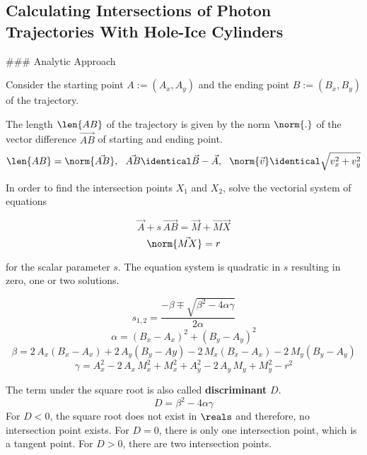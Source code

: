 
\subsection{Calculating Intersections of Photon Trajectories With Hole-Ice Cylinders}
\label{sec:intersections}

### Analytic Approach


Consider the starting point $A := (A_x, A_y)$ and the ending point $B := (B_x, B_y)$ of the trajectory.

The length $\len{AB}$ of the trajectory is given by the norm $\norm{.}$ of the vector difference $\vec{AB}$ of starting and ending point.
\begin{equation} \notag
  \len{AB} = \norm{\vec{AB}}, \ \ \vec{AB} \identical \vec{B} - \vec{A}, \ \ \norm{\vec{v}} \identical \sqrt{v_x^2 + v_y^2}
\end{equation}

In order to find the intersection points $X_1$ and $X_2$, solve the vectorial system of equations

\begin{equation}
  \vec{A} + s \, \vec{AB} = \vec{M} + \vec{MX}
\end{equation}
\begin{equation}
  \norm{\vec{MX}} = r
\end{equation}

for the scalar parameter $s$. The equation system is quadratic in $s$ resulting in zero, one or two solutions.

\begin{equation}
  s_{1,2} = \frac{-\beta \mp \sqrt{\beta^2 - 4\alpha\gamma}}{2\alpha}
\end{equation}
\begin{equation}
  \alpha = (B_x - A_x)^2 + (B_y - A_y)^2
\end{equation}
\begin{equation}
  \beta = 2\,A_x(B_x-A_x) + 2\,A_y(B_y-Ay) - 2\,M_x(B_x-A_x) - 2\,M_y(B_y-A_y)
\end{equation}
\begin{equation}
  \gamma = A_x^2 - 2\,A_x\,M_x^2 + M_x^2 + A_y^2 - 2\,A_y\,M_y + M_y^2 - r^2
\end{equation}

The term under the square root is also called \textbf{discriminant} $D$.
\begin{equation}
  D = \beta^2 - 4\alpha\gamma
\end{equation}
For $D < 0$, the square root does not exist in $\reals$ and therefore, no intersection point exists. For $D = 0$, there is only one intersection point, which is a tangent point. For $D > 0$, there are two intersection points.

